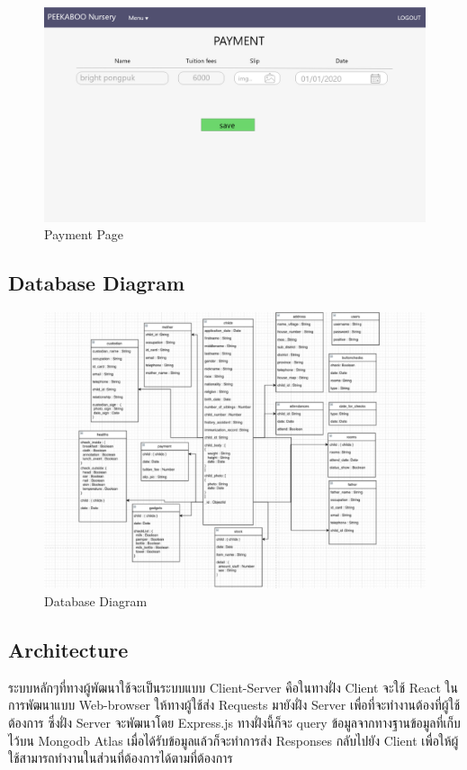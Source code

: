 \begin{figure}
  \begin{center}
  \includegraphics[width=140mm]{images/paymentPage.png}
  \end{center}
  \caption[Poem]{Payment Page}
  \label{fig:walrus}
  \end{figure}


\subsection{Database Diagram}
\begin{figure}
  \begin{center}
  \includegraphics[width=140mm]{images/DiagramNursery2}
  \end{center}
  \caption[Poem]{Database Diagram}
  \label{fig:walrus}
  \end{figure}

\subsection{Architecture}
ระบบหลักๆที่ทางผู้พัฒนาใช้จะเป็นระบบแบบ Client-Server คือในทางฝั่ง Client จะใช้ React ในการพัฒนาแบบ Web-browser ให้ทางผู้ใช้ส่ง Requests มายังฝั่ง Server เพื่อที่จะทำงานต้องที่ผู้ใช้ต้องการ ซึ่งฝั่ง Server 
จะพัฒนาโดย Express.js ทางฝั่งนี้ก็จะ query ข้อมูลจากทางฐานข้อมูลที่เก็บไว้บน Mongodb Atlas เมื่อได้รับข้อมูลแล้วก็จะทำการส่ง Responses กลับไปยัง Client เพื่อให้ผู้ใช้สามารถทำงานในส่วนที่ต้องการได้ตามที่ต้องการ



